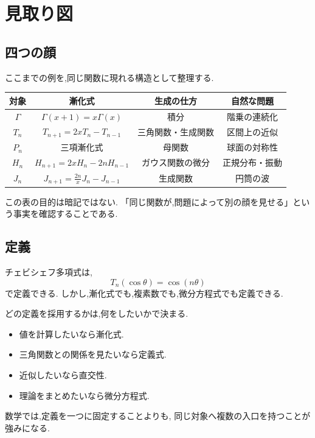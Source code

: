 \section{見取り図}

\subsection{四つの顔}

ここまでの例を,同じ関数に現れる構造として整理する.

\begin{center}
\begin{tabular}{c|c|c|c}
  対象 & 漸化式 & 生成の仕方 & 自然な問題\\ \hline
  $\Gamma$ & $\Gamma(x+1)=x\Gamma(x)$
    & 積分 & 階乗の連続化\\
  $T_n$ & $T_{n+1}=2xT_n-T_{n-1}$
    & 三角関数・生成関数 & 区間上の近似\\
  $P_n$ & 三項漸化式
    & 母関数 & 球面の対称性\\
  $H_n$ & $H_{n+1}=2xH_n-2nH_{n-1}$
    & ガウス関数の微分 & 正規分布・振動\\
  $J_n$ & $J_{n+1}=\frac{2n}{x}J_n-J_{n-1}$
    & 生成関数 & 円筒の波\\
\end{tabular}
\end{center}

この表の目的は暗記ではない.
「同じ関数が,問題によって別の顔を見せる」という事実を確認することである.

\subsection{定義}

チェビシェフ多項式は,
\[
  T_n(\cos\theta)=\cos(n\theta)
\]
で定義できる.
しかし,漸化式でも,複素数でも,微分方程式でも定義できる.

どの定義を採用するかは,何をしたいかで決まる.

\begin{itemize}
  \item 値を計算したいなら漸化式.
  \item 三角関数との関係を見たいなら定義式.
  \item 近似したいなら直交性.
  \item 理論をまとめたいなら微分方程式.
\end{itemize}

数学では,定義を一つに固定することよりも,
同じ対象へ複数の入口を持つことが強みになる.


